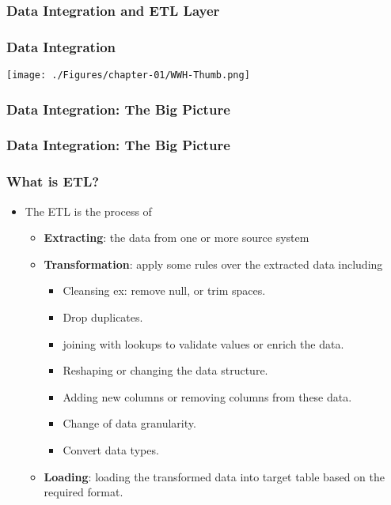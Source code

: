 \subsubsection{Data Integration and ETL Layer}

\begin{frame}
    \frametitle{Data Integration}

    \texttt{[image: ./Figures/chapter-01/WWH-Thumb.png]}

\end{frame}
\begin{frame}
    \frametitle{Data Integration: The Big Picture}

    

\end{frame}
\begin{frame}
    \frametitle{Data Integration: The Big Picture}

    

\end{frame}
\begin{frame}
    \frametitle{What is ETL?}

    \begin{itemize}[<+->]
        \item The ETL is the process of
        \begin{itemize}[<+->]
            \item  \textbf{Extracting}: the data from one or more source system
            \item  \textbf{Transformation}: apply some rules over the extracted data including
            \begin{itemize}[<+->]
                \item Cleansing ex: remove null, or trim spaces.
                \item Drop duplicates.
                \item joining with lookups to validate values or enrich the data.
                \item Reshaping or changing the data structure.
                \item Adding new columns or removing columns from these data.
                \item Change of data granularity.
                \item Convert data types.
            \end{itemize}
            \item \textbf{Loading}: loading the transformed data into target table based on the required format.
        \end{itemize}    
    \end{itemize}

\end{frame}
